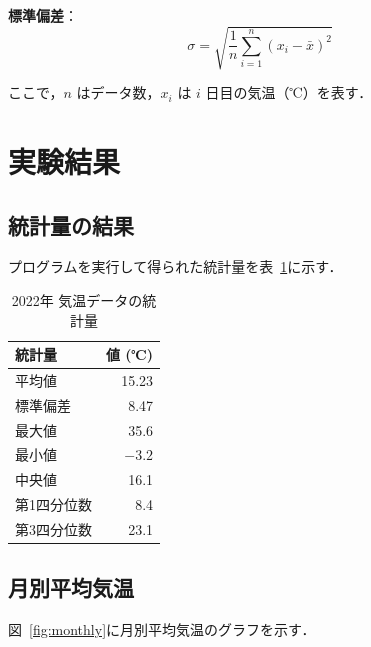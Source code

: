 \documentclass[12pt,a4paper]{ltjsarticle}
\begin{document}
\textbf{標準偏差}：
\begin{equation}
  \sigma = \sqrt{\frac{1}{n} \sum_{i=1}^{n} {(x_i - \bar{x})}^{2}}
  \label{eq:std}
\end{equation}

ここで，$n$ はデータ数，$x_i$ は $i$ 日目の気温（℃）を表す．

\section{実験結果}\label{sec:result}

\subsection{統計量の結果}

プログラムを実行して得られた統計量を表~\ref{tab:stats}に示す．

\begin{table}[htbp]
  \centering
  \caption{2022年 気温データの統計量}\label{tab:stats}
  \begin{tabular}{lr}
    \toprule
    \textbf{統計量} & \textbf{値 (℃)} \\
    \midrule
    平均値          & 15.23 \\
    標準偏差        & 8.47  \\
    最大値          & 35.6  \\
    最小値          & $-3.2$ \\
    中央値          & 16.1  \\
    第1四分位数     & 8.4   \\
    第3四分位数     & 23.1  \\
    \bottomrule
  \end{tabular}
\end{table}

\subsection{月別平均気温}

図~\ref{fig:monthly}に月別平均気温のグラフを示す．
\end{document}
